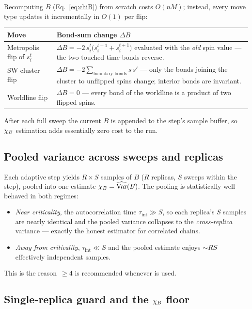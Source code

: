 Recomputing $B$ (Eq.~\eqref{eq:chiB}) from scratch costs $O(nM)$; instead,
every move type updates it incrementally in $O(1)$ per flip:

\begin{center}
\small
\begin{tabular}{@{}lp{9.1cm}@{}}
\toprule
\textbf{Move} & \textbf{Bond-sum change $\Delta B$}\\
\midrule
Metropolis flip of $s^t_i$ &
$\Delta B=-2\,s^t_i\bigl(s^{t-1}_i+s^{t+1}_i\bigr)$ evaluated with the
\emph{old} spin value --- the two touched time-bonds reverse.\\
SW cluster flip &
$\Delta B=-2\sum_{\text{boundary bonds}} s\,s'$ --- only the bonds joining
the cluster to unflipped spins change; interior bonds are invariant.\\
Worldline flip &
$\Delta B=0$ --- every bond of the worldline is a product of two flipped
spins.\\
\bottomrule
\end{tabular}
\end{center}

After each full sweep the current $B$ is appended to the step's sample
buffer, so $\chi_B$ estimation adds essentially zero cost to the run.

\subsection{Pooled variance across sweeps and replicas}

Each adaptive step yields $R\times S$ samples of $B$ ($R$ replicas,
$S$ sweeps within the step), pooled into one estimate
$\chi_B=\widehat{\operatorname{Var}}(B)$. The pooling is statistically
well-behaved in both regimes:
\begin{itemize}
\item \emph{Near criticality}, the autocorrelation time
$\tau_{\mathrm{int}}\gg S$, so each replica's $S$ samples are nearly
identical and the pooled variance collapses to the \emph{cross-replica}
variance --- exactly the honest estimator for correlated chains.
\item \emph{Away from criticality}, $\tau_{\mathrm{int}}\ll S$ and the
pooled estimate enjoys $\sim RS$ effectively independent samples.
\end{itemize}
This is the reason \,$\geq4$ is recommended whenever
 is used.

\subsection{Single-replica guard and the \texorpdfstring{$\chi_B$}{chi-B} floor}

